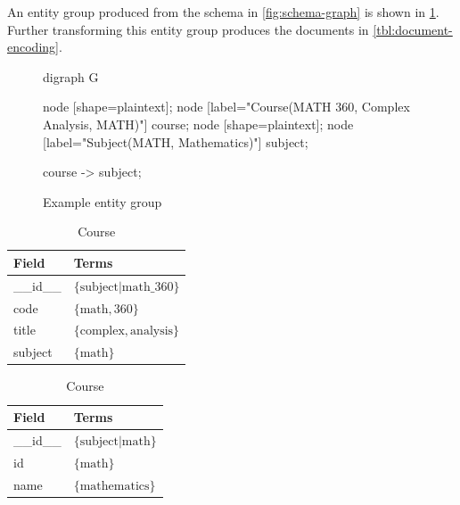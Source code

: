 		\begin{ex}
			An entity group produced from the schema in \cref{fig:schema-graph} is shown in \cref{fig:entity-group}.  Further transforming this entity group produces the documents in \cref{tbl:document-encoding}.
			
			\begin{figure}
				\centering
				
				\begin{dot2tex}[dot]
					digraph G {
						node [shape=plaintext]; {node [label="Course(MATH 360, Complex Analysis, MATH)"] course;}
						node [shape=plaintext]; {node [label="Subject(MATH, Mathematics)"] subject;}
						
						course -> subject;
					}
				\end{dot2tex}
				
				\caption{Example entity group}
				\label{fig:entity-group}
			\end{figure}
			
			\begin{table}
				\begin{subtable}[b]{0.33\linewidth}
					\centering
					
					\begin{tabular}{ll}
						\toprule
						Field & Terms \\
						\midrule
						\_\_id\_\_ & \(\{\text{subject|math\_360}\}\) \\
						code & \(\{\text{math}, \text{360}\}\) \\
						title & \(\{\text{complex}, \text{analysis}\}\) \\
						subject & \(\{\text{math}\}\) \\
						\bottomrule
					\end{tabular}
					
					\caption{Course}
				\end{subtable}
				\begin{subtable}[b]{0.33\linewidth}
					\centering
					
					\begin{tabular}{ll}
						\toprule
						Field & Terms \\
						\midrule
						\_\_id\_\_ & \(\{\text{subject|math}\}\) \\
						id & \(\{\text{math}\}\) \\
						name & \(\{\text{mathematics}\}\) \\
						\bottomrule
					\end{tabular}
					

\end{subtable}
\end{table}
\end{ex}
